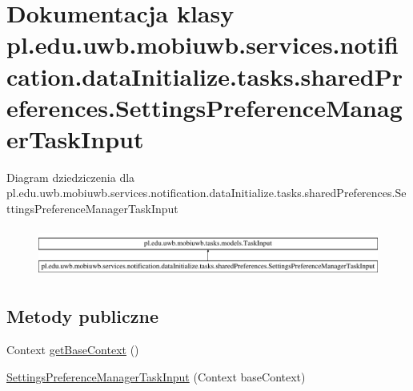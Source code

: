 \hypertarget{classpl_1_1edu_1_1uwb_1_1mobiuwb_1_1services_1_1notification_1_1data_initialize_1_1tasks_1_1shar69ec0073db8abb8d962316ce12a7876e}{}\section{Dokumentacja klasy pl.\+edu.\+uwb.\+mobiuwb.\+services.\+notification.\+data\+Initialize.\+tasks.\+shared\+Preferences.\+Settings\+Preference\+Manager\+Task\+Input}
\label{classpl_1_1edu_1_1uwb_1_1mobiuwb_1_1services_1_1notification_1_1data_initialize_1_1tasks_1_1shar69ec0073db8abb8d962316ce12a7876e}
Diagram dziedziczenia dla pl.\+edu.\+uwb.\+mobiuwb.\+services.\+notification.\+data\+Initialize.\+tasks.\+shared\+Preferences.\+Settings\+Preference\+Manager\+Task\+Input\begin{figure}[H]
\begin{center}
\leavevmode
\includegraphics[height=1.632653cm]{classpl_1_1edu_1_1uwb_1_1mobiuwb_1_1services_1_1notification_1_1data_initialize_1_1tasks_1_1shar69ec0073db8abb8d962316ce12a7876e}
\end{center}
\end{figure}
\subsection*{Metody publiczne}
\begin{DoxyCompactItemize}
\item 
Context \hyperlink{classpl_1_1edu_1_1uwb_1_1mobiuwb_1_1services_1_1notification_1_1data_initialize_1_1tasks_1_1shar69ec0073db8abb8d962316ce12a7876e_aadb1ff3e8cdabcf38723c9cd135bd14d}{get\+Base\+Context} ()
\item 
\hyperlink{classpl_1_1edu_1_1uwb_1_1mobiuwb_1_1services_1_1notification_1_1data_initialize_1_1tasks_1_1shar69ec0073db8abb8d962316ce12a7876e_aa27a5737ea18a9b10e8bdf785459afaf}{Settings\+Preference\+Manager\+Task\+Input} (Context base\+Context)
\end{DoxyCompactItemize}


